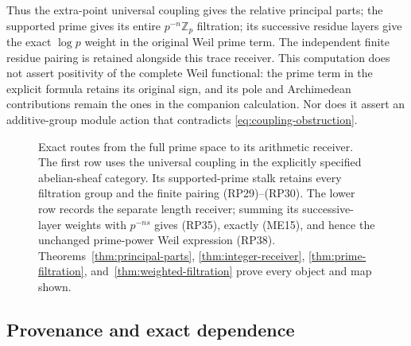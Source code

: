 \documentclass[11pt,a4paper]{article}
\theoremstyle{definition}\newtheorem{definition}[theorem]{Definition}
\providecommand{\PP}{\mathcal P}
\begin{document}
Thus the extra-point universal coupling gives the relative principal
parts; the supported prime gives its entire $p^{-n}\mathbb Z_p$
filtration; its successive residue layers give the exact $\log p$
weight in the original Weil prime term. The independent finite residue
pairing is retained alongside this trace receiver. This computation
does not assert positivity of the complete Weil functional: the prime
term in the explicit formula retains its original sign, and its pole
and Archimedean contributions remain the ones in the companion
calculation. Nor does it assert an additive-group module action that
contradicts \eqref{eq:coupling-obstruction}.

\begin{figure}[ht]
\centering
{}
\medskip
{}
\caption{Exact routes from the full prime space to its arithmetic
receiver. The first row uses the universal coupling in the explicitly
specified abelian-sheaf category. Its supported-prime stalk retains
every filtration group and the finite pairing (RP29)--(RP30).
The lower row records the separate length receiver; summing its
successive-layer weights with $p^{-ns}$ gives (RP35), exactly (ME15),
and hence the unchanged prime-power Weil expression (RP38).
Theorems~\ref{thm:principal-parts}, \ref{thm:integer-receiver},
\ref{thm:prime-filtration}, and~\ref{thm:weighted-filtration}
prove every object and map shown.}
\end{figure}

\subsection{Provenance and exact dependence}
\end{document}
